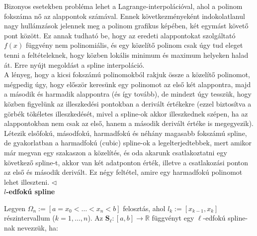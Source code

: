 \documentclass[tikz,12pt,margin=0px]{article}
\begin{document}
    {\footnotesize \noindent {\color{blue} \faLightbulbO\ $\triangleright$ } }
    {\footnotesize
    Bizonyos esetekben probléma lehet a Lagrange-interpolációval, ahol a polinom fokszáma nő az alappontok számával. Ennek következményeként indokolatlanul nagy hullámzások jelennek meg a polinom grafikus képében, két egymást követő pont között. Ez annak tudható be, hogy az eredeti alappontokat szolgáltató $f(x)$ függvény nem polinomiális, és egy közelítő polinom csak úgy tud eleget tenni a feltételeknek, hogy közben lokális minimum és maximum helyeken halad át. Erre nyújt megoldást a spline interpoláció.\\

    \noindent A lényeg, hogy a kicsi fokszámú polinomokból rakjuk össze a közelítő polinomot, mégpedig úgy, hogy először keresünk egy polinomot az első két alappontra, majd a második és harmadik alappontra (és így tovább), de mindezt úgy tesszük, hogy közben figyelünk az illeszkedési pontokban a derivált értékekre (ezzel biztosítva a görbék tökéletes illeszkedését, mivel a spline-ok akkor illeszkednek szépen, ha az alappontokban nem csak az első, hanem a második derivált értéke is megegyezik). \\

    \noindent Létezik elsőfokú, másodfokú, harmadfokú és néhány magasabb fokszámú spline, de gyakorlatban a harmadfokú (cubic) spline-ok a legelterjedtebbek, mert amikor már megvan egy szakaszon a közelítés, és oda akarunk csatlakoztatni egy következő spline-t, akkor van két adatponton érték, illetve a csatlakozási ponton az első és második derivált. Ez négy feltétel, amire egy harmadfokú polinomot lehet illeszteni. $\triangleleft$ \faLightbulbO}\\
\newpage
    \noindent \textbf{$l$-edfokú spline\\}

    \noindent Legyen $\Omega_{n} := [a = x_0 < \ldots < x_n < b]$ felosztás, ahol $l_k := [x_{k-1}, x_k]$ részintervallum ($k = 1, \ldots, n$). Az $\mathbf{S}_{\ell}:[a,b] \to \mathbb{R}$ függvényt egy $\ell$-edfokú spline-nak nevezzük, ha:
	
\end{document}
